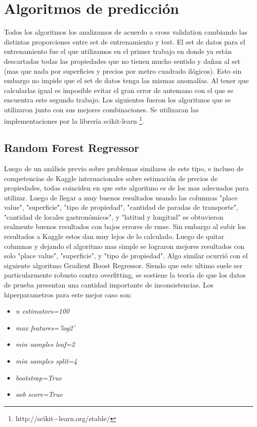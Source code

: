 \documentclass[a4paper, 10pt]{article}
\begin{document}
	\section{Algoritmos de predicción}
		Todos los algoritmos los analizamos de acuerdo a cross validation cambiando las distintas proporciones entre set de entrenamiento y test. El set de datos para el entrenamiento fue el que utilizamos en el primer trabajo en donde ya están descartadas todas las propiedades que no tienen mucho sentido y dañan al set (mas que nada por superficies y precios por metro cuadrado ilógicos). Esto sin embargo no impide que el set de datos tenga las mismas anomalías. Al tener que calcularlas igual es imposible evitar el gran error de antemano con el que se encuentra este segundo trabajo. Los siguientes fueron los algoritmos que se utilizaron junto con sus mejores combinaciones. Se utilizaran las implementaciones por la librería scikit-learn \footnote{http://scikit$-$learn.org/stable/}. 
		
		\subsection{Random Forest Regressor}
		
			Luego de un análisis previo sobre problemas similares de este tipo, e incluso de competencias de Kaggle internacionales sobre estimación de precios de propiedades, todas coinciden en que este algoritmo es de los mas adecuados para utilizar. Luego de llegar a muy buenos resultados usando las columnas "place value", "superficie", "tipo de propiedad", "cantidad de paradas de transporte", "cantidad de locales gastronómicos", y "latitud y longitud" se obtuvieron realmente buenos resultados con bajos errores de rmse. Sin embargo al subir los resultados a Kaggle estos dan muy lejos de lo calculado. Luego de quitar columnas y dejando el algoritmo mas simple se lograron mejores resultados con solo "place value", "superficie", y "tipo de propiedad". Algo similar ocurrió con el siguiente algoritmo Gradient Boost Regressor. Siendo que este ultimo suele ser particularmente robusto contra overfitting, se sostiene la teoría de que los datos de prueba presentan una cantidad importante de inconsistencias. Los hiperparametros para este mejor caso son:
			 
		\begin{itemize}
		
		\item \emph{n estimators=100}
			
		\item \emph{max features='log2'}

		\item \emph{min samples leaf=2}
		
		\item \emph{min samples split=4}
		
		\item \emph{bootstrap=True}
		
		\item \emph{oob score=True} 
			
		\end{itemize}
		
\end{document}
